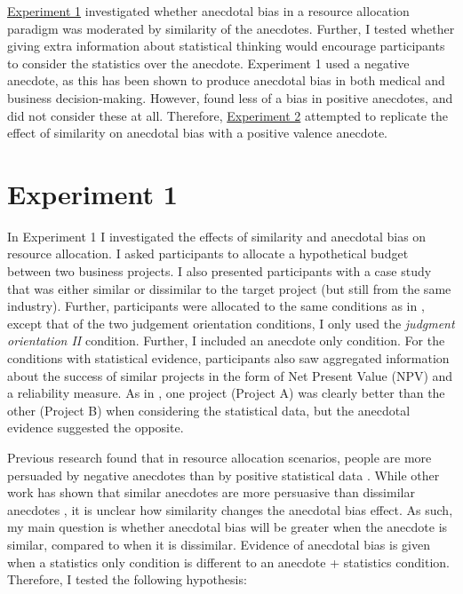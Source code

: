\documentclass[a4paper, nobind, dvipsnames]{templates/ociamthesis}
\theoremstyle{definition}
\theoremstyle{definition}
\theoremstyle{definition}
\theoremstyle{definition}
\theoremstyle{remark}
\begin{document}
\protect\hyperlink{anecdotes-1}{Experiment 1} investigated whether anecdotal bias in a resource
allocation paradigm was moderated by similarity of the anecdotes. Further, I
tested whether giving extra information about statistical thinking would
encourage participants to consider the statistics over the anecdote. Experiment
1 used a negative anecdote, as this has been shown to produce anecdotal bias in
both medical \autocite{jaramillo2019} and business \autocite{wainberg2018} decision-making.
However, \textcite{jaramillo2019} found less of a bias in positive anecdotes, and
\textcite{wainberg2018} did not consider these at all. Therefore, \protect\hyperlink{anecdotes-2}{Experiment
2} attempted to replicate the effect of similarity on anecdotal
bias with a positive valence anecdote.

\hypertarget{anecdotes-1}{%
\section{Experiment 1}\label{anecdotes-1}}

In Experiment 1 I investigated the effects of similarity and anecdotal bias on
resource allocation. I asked participants to allocate a hypothetical budget
between two business projects. I also presented participants with a case study
that was either similar or dissimilar to the target project (but still from the
same industry). Further, participants were allocated to the same conditions as
in \textcite{wainberg2018}, except that of the two judgement orientation conditions, I
only used the \emph{judgment orientation II} condition. Further, I included an
anecdote only condition. For the conditions with statistical evidence,
participants also saw aggregated information about the success of similar
projects in the form of Net Present Value (NPV) and a reliability measure. As in
\textcite{wainberg2018}, one project (Project A) was clearly better than the other
(Project B) when considering the statistical data, but the anecdotal evidence
suggested the opposite.

Previous research found that in resource allocation scenarios, people are more
persuaded by negative anecdotes than by positive statistical data
\autocite{wainberg2018}. While other work has shown that similar anecdotes are more
persuasive than dissimilar anecdotes \autocite[Study 3]{hoeken2009}, it is unclear how
similarity changes the anecdotal bias effect. As such, my main question is
whether anecdotal bias will be greater when the anecdote is similar, compared to
when it is dissimilar. Evidence of anecdotal bias is given when a statistics
only condition is different to an anecdote + statistics condition. Therefore, I
tested the following hypothesis:
\end{document}
